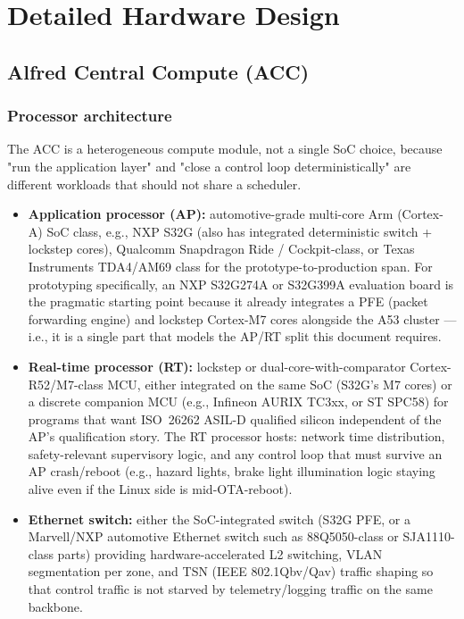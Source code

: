 \section{Detailed Hardware Design}
\label{sec:hardware-design}

\subsection{Alfred Central Compute (ACC)}
\label{sec:acc}

\subsubsection{Processor architecture}

The ACC is a heterogeneous compute module, not a single SoC choice, because "run the application layer" and "close a control loop deterministically" are different workloads that should not share a scheduler.

\begin{itemize}
\item \textbf{Application processor (AP):} automotive-grade multi-core Arm (Cortex-A) SoC class, e.g., NXP S32G (also has integrated deterministic switch + lockstep cores), Qualcomm Snapdragon Ride / Cockpit-class, or Texas Instruments TDA4/AM69 class for the prototype-to-production span. For prototyping specifically, an NXP S32G274A or S32G399A evaluation board is the pragmatic starting point because it already integrates a PFE (packet forwarding engine) and lockstep Cortex-M7 cores alongside the A53 cluster --- i.e., it is a single part that models the AP/RT split this document requires.
\item \textbf{Real-time processor (RT):} lockstep or dual-core-with-comparator Cortex-R52/M7-class MCU, either integrated on the same SoC (S32G's M7 cores) or a discrete companion MCU (e.g., Infineon AURIX TC3xx, or ST SPC58) for programs that want ISO~26262 ASIL-D qualified silicon independent of the AP's qualification story. The RT processor hosts: network time distribution, safety-relevant supervisory logic, and any control loop that must survive an AP crash/reboot (e.g., hazard lights, brake light illumination logic staying alive even if the Linux side is mid-OTA-reboot).
\item \textbf{Ethernet switch:} either the SoC-integrated switch (S32G PFE, or a Marvell/NXP automotive Ethernet switch such as 88Q5050-class or SJA1110-class parts) providing hardware-accelerated L2 switching, VLAN segmentation per zone, and TSN (IEEE 802.1Qbv/Qav) traffic shaping so that control traffic is not starved by telemetry/logging traffic on the same backbone.
\end{itemize}

